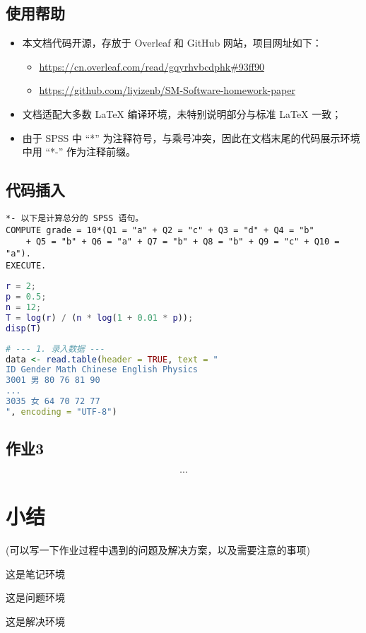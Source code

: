 \documentclass[12pt]{HomeWork}
\begin{document}
\subsection{使用帮助}
\begin{itemize}
    \item 本文档代码开源，存放于 Overleaf 和 GitHub 网站，项目网址如下：
    \begin{itemize}
        \item \href{https://cn.overleaf.com/read/gqyrhvbcdphk\#93ff90}{\url{https://cn.overleaf.com/read/gqyrhvbcdphk\#93ff90}}
        \item \href{https://github.com/liyizenb/SM-Software-homework-paper}{\url{https://github.com/liyizenb/SM-Software-homework-paper}}
    \end{itemize}
    \item 文档适配大多数 LaTeX 编译环境，未特别说明部分与标准 LaTeX 一致；
    \item 由于 SPSS 中 ``*'' 为注释符号，与乘号冲突，因此在文档末尾的代码展示环境中用 ``*-'' 作为注释前缀。
\end{itemize}

\subsection{代码插入}
\begin{lstlisting}[language=SPSS, caption={SPSS 代码示例}]
*- 以下是计算总分的 SPSS 语句。
COMPUTE grade = 10*(Q1 = "a" + Q2 = "c" + Q3 = "d" + Q4 = "b" 
    + Q5 = "b" + Q6 = "a" + Q7 = "b" + Q8 = "b" + Q9 = "c" + Q10 = "a").
EXECUTE.
\end{lstlisting}
\begin{lstlisting}[language=Matlab, caption={Matlab 代码示例}]
r = 2;
p = 0.5;
n = 12;
T = log(r) / (n * log(1 + 0.01 * p));
disp(T)
\end{lstlisting}
\begin{lstlisting}[language=R, caption={R语言 代码示例}]
# --- 1. 录入数据 ---
data <- read.table(header = TRUE, text = "
ID Gender Math Chinese English Physics
3001 男 80 76 81 90
...
3035 女 64 70 72 77
", encoding = "UTF-8")
\end{lstlisting}

\subsection{作业3}
$$\cdots$$



\section*{小结}
(可以写一下作业过程中遇到的问题及解决方案，以及需要注意的事项)

\begin{note}
    这是笔记环境
\end{note}

\begin{prb}
    这是问题环境
\end{prb}

\begin{soln}
    这是解决环境
\end{soln}
\end{document}
